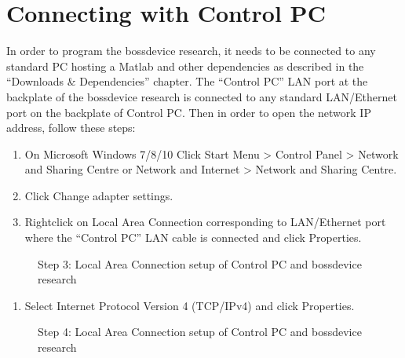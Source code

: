 \documentclass[letterpaper,10pt,english]{sphinxmanual}
\begin{document}
\section{Connecting with Control PC}
\label{\detokenize{2_setup_bossdevice_research:connecting-with-control-pc}}
\sphinxAtStartPar
In order to program the bossdevice research, it needs to be connected to any standard PC hosting a Matlab and other dependencies as described in the “Downloads \& Dependencies” chapter. The “Control PC” LAN port at the backplate of the bossdevice research is connected to any standard LAN/Ethernet port on the backplate of Control PC. Then in order to open the network IP address, follow these steps:
\begin{enumerate}
%
\item {} 
\sphinxAtStartPar
On Microsoft Windows 7/8/10 Click Start Menu \textgreater{} Control Panel \textgreater{} Network and Sharing Centre or Network and Internet \textgreater{} Network and Sharing Centre.

\item {} 
\sphinxAtStartPar
Click Change adapter settings.

\item {} 
\sphinxAtStartPar
Right\sphinxhyphen{}click on Local Area Connection corresponding to LAN/Ethernet port where the “Control PC” LAN cable is connected and click Properties.

\end{enumerate}

\begin{figure}[htbp]
\centering
\capstart

\noindent{}
\caption{Step 3: Local Area Connection setup of Control PC and bossdevice research}\label{\detokenize{2_setup_bossdevice_research:id2}}\end{figure}
\begin{enumerate}
%
\setcounter{enumi}{3}
\item {} 
\sphinxAtStartPar
Select Internet Protocol Version 4 (TCP/IPv4) and click Properties.

\end{enumerate}

\begin{figure}[htbp]
\centering
\capstart

\noindent{}
\caption{Step 4: Local Area Connection setup of Control PC and bossdevice research}\label{\detokenize{2_setup_bossdevice_research:id3}}\end{figure}
\end{document}
